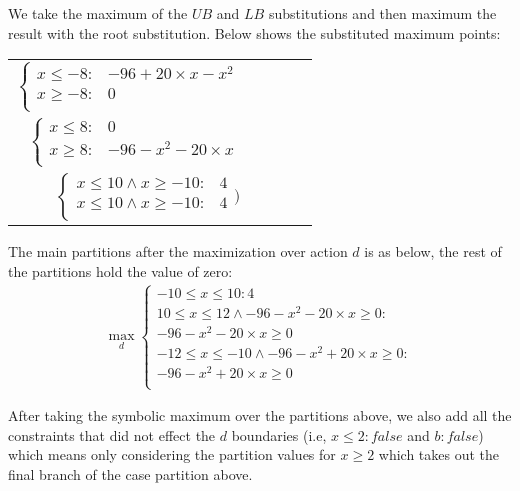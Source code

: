We take the maximum of the $\mathit{UB}$ and $\mathit{LB}$  substitutions and then maximum the result with the root substitution. Below shows the substituted maximum points:

{\footnotesize
\begin{center}
\begin{tabular} {r c c c l}
\hspace{-4mm}
$
\begin{cases}
x \leq -8 : & -96 + 20 \times x - x^2 \\ 
x \geq -8 : & 0 \\ 
\end{cases} $

\\
\hspace{-4mm}
$ \begin{cases}
x \leq 8 : & 0 \\ 
x \geq 8: & -96 -x^2 -20\times x\\
\end{cases}$
\hspace{-4mm} 
\\
\hspace{-4mm}
$\begin{cases}
x \leq 10 \wedge x \geq -10 : & 4 \\ 
x \leq 10 \wedge x \geq -10 : & 4 \\ 
\end{cases})$
\end{tabular}
\end{center}
}

The main partitions after the maximization over action $d$ is as below, the rest of the partitions hold the value of zero: 
\begin{align*}
\max_{d}
\begin{cases}
-10 \leq x \leq 10 : 4 \\ 
10 \leq x \leq 12  \wedge  -96-x^2-20\times x \geq 0: \\ -96-x^2-20\times x \geq 0 \\ 
-12 \leq x \leq -10  \wedge  -96-x^2+20\times x \geq 0:\\ -96-x^2+20\times x \geq 0 \\
  \end{cases}
\end{align*}

After taking the symbolic maximum over the partitions above, we also add all the constraints that did not effect the $d$ boundaries (i.e, $x\leq 2:false $ and $b:false$) which means only considering the partition values for $x \geq 2$ which takes out the final branch of the case partition above. 

